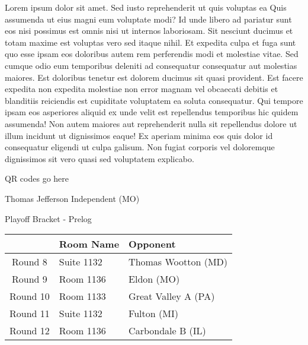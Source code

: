 \documentclass{article}%
\begin{document}
\vspace*{8pt}%
\linebreak%
\newline%
\newline%
Lorem ipsum dolor sit amet. Sed iusto reprehenderit ut quis voluptas ea Quis assumenda ut eius magni eum voluptate modi? Id unde libero ad pariatur sunt eos nisi possimus est omnis nisi ut internos laboriosam. Sit nesciunt ducimus et totam maxime est voluptas vero sed itaque nihil. Et expedita culpa et fuga sunt quo esse ipsam eos doloribus autem rem perferendis modi et molestiae vitae.\newline%
\newline%
Sed cumque odio eum temporibus deleniti ad consequatur consequatur aut molestias maiores. Est doloribus tenetur est dolorem ducimus sit quasi provident. Est facere expedita non expedita molestiae non error magnam vel obcaecati debitis et blanditiis reiciendis est cupiditate voluptatem ea soluta consequatur. Qui tempore ipsam eos asperiores aliquid ex unde velit est repellendus temporibus hic quidem assumenda!\newline%
\newline%
Non autem maiores aut reprehenderit nulla sit repellendus dolore ut illum incidunt ut dignissimos eaque! Ex aperiam minima eos quis dolor id consequatur eligendi ut culpa galisum. Non fugiat corporis vel doloremque dignissimos sit vero quasi sed voluptatem explicabo.\newline%
\newline%
%
\vspace*{30pt}%
\begin{center}%
\begin{Huge}%
QR codes go here%
\end{Huge}%
\end{center}%
\newpage%
\begin{center}%
\begin{Huge}%
Thomas Jefferson Independent (MO)%
\end{Huge}%
\vspace*{8pt}%
\linebreak%
\begin{Large}%
Playoff Bracket {-} Prelog%
\end{Large}%
\end{center}%
%
\begin{tabularx}{\textwidth}{|c|Y|Y|}%
\hline%
&Room Name&Opponent\\%
\hline%
Round 8&Suite 1132&Thomas Wootton (MD)\\%
Round 9&Room 1136&Eldon (MO)\\%
Round 10&Room 1133&Great Valley A (PA)\\%
Round 11&Suite 1132&Fulton (MI)\\%
Round 12&Room 1136&Carbondale B (IL)\\%
\hline%
\end{tabularx}%
\end{document}
